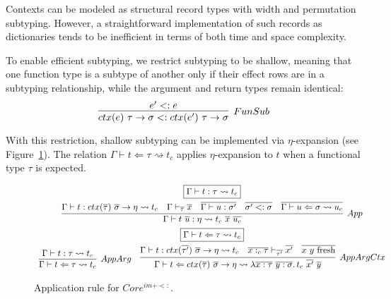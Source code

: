 \documentclass[acmsmall,review,screen]{acmart}
\newcommand{\mathframebox}[1]{\framebox{$\displaystyle #1$}}
\newcommand{\ap}{~}
\newcommand{\ctx}[1]{ctx(#1)~}
\newcommand{\step}{\rightsquigarrow}
\begin{document}
Contexts can be modeled as structural record types with width and permutation subtyping.
However, a straightforward implementation of such records as dictionaries tends to be inefficient in terms of both time and space complexity.

To enable efficient subtyping, we restrict subtyping to be shallow, meaning that one function type is a subtype of another only if their effect rows are in a subtyping relationship, while the argument and return types remain identical:
\[
    \infer[FunSub]{\ctx{e} \tau \to \sigma <: \ctx{e'} \tau\to\sigma}{e' <: e}
\]

With this restriction, shallow subtyping can be implemented via $\eta$-expansion (see Figure~\ref{sig:fim-sub-app}).
The relation $\Gamma\vdash t\Leftarrow \tau \step t_c$ applies $\eta$-expansion to $t$ when a functional type $\tau$ is expected.

\begin{figure}
    \begin{gather*}
        \mathframebox{\Gamma\vdash t : \tau \step t_c} \\
        \infer[App]{
            \Gamma\vdash t\ap\overline{u} : \eta \step t_c \ap \overline{x} \ap \overline{u_c}
        }{
            \Gamma\vdash t : ctx(\overline{\tau})~\overline{\sigma}\to \eta \step t_c
            &
            \Gamma \vdash_{\overline{\tau}} \overline{x}
            &
            \overline{\Gamma\vdash u : \sigma'}
            &
            \overline{\sigma' <: \sigma}
            &
            \overline{\Gamma\vdash u \Leftarrow \sigma \step u_c}
        } \\
        \mathframebox{\Gamma\vdash t \Leftarrow \tau \step t_c} \\
        \begin{array}{cc}
            \infer[AppArg]{
                \Gamma\vdash t \Leftarrow \tau \step t_c
            }{
                \Gamma\vdash t : \tau \step t_c
            }
            &
            \infer[AppArgCtx]{
                \Gamma \vdash t \Leftarrow ctx(\overline{\tau}) ~\overline{\sigma}\to\eta\step \lambda \overline{x : \tau}~\overline{y : \sigma}\ldotp t_c\ap \overline{x'}\ap\overline{y}
            }{
                \Gamma \vdash t : ctx(\overline{\tau'}) ~\overline{\sigma}\to\eta \step t_c
                &
                \overline{x :_c \tau} \vdash_{\overline{\tau'}} \overline{x'}
                &
                \overline{x~y \text{ fresh}}
            }
        \end{array}
    \end{gather*}
    \caption{Application rule for $Core^{im + <:}$.}
    \label{sig:fim-sub-app}
\end{figure}
\end{document}

